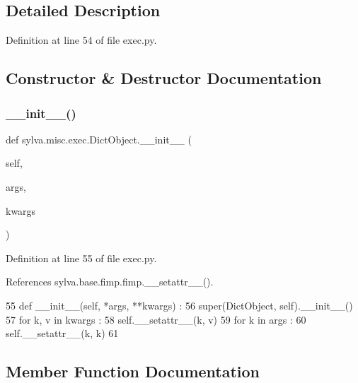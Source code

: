 \subsection{Detailed Description}


Definition at line 54 of file exec.\+py.



\subsection{Constructor \& Destructor Documentation}
\mbox{\label{classsylva_1_1misc_1_1exec_1_1_dict_object_acd7ac78ad80858775f4752edab3bb9f0}} 
\subsubsection{\texorpdfstring{\+\_\+\+\_\+init\+\_\+\+\_\+()}{\_\_init\_\_()}}
{\footnotesize\ttfamily def sylva.\+misc.\+exec.\+Dict\+Object.\+\_\+\+\_\+init\+\_\+\+\_\+ (\begin{DoxyParamCaption}\item[{}]{self,  }\item[{}]{args,  }\item[{}]{kwargs }\end{DoxyParamCaption})}



Definition at line 55 of file exec.\+py.



References sylva.\+base.\+fimp.\+fimp.\+\_\+\+\_\+setattr\+\_\+\+\_\+().


\begin{DoxyCode}
55   \textcolor{keyword}{def }\_\_init\_\_(self, *args, **kwargs) :
56     super(DictObject, self).\_\_init\_\_()
57     \textcolor{keywordflow}{for} k, v \textcolor{keywordflow}{in} kwargs :
58       self.\_\_setattr\_\_(k, v)
59     \textcolor{keywordflow}{for} k \textcolor{keywordflow}{in} args :
60       self.\_\_setattr\_\_(k, k)
61 
\end{DoxyCode}


\subsection{Member Function Documentation}
\mbox{\label{classsylva_1_1misc_1_1exec_1_1_dict_object_a194306589e55ae82911d017462eb5f8e}} 
